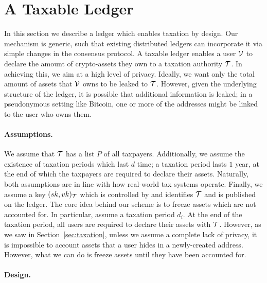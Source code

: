 \section{A Taxable Ledger}\label{sec:taxchain}

In this section we describe a ledger which enables taxation by design. Our
mechanism is generic, such that existing distributed ledgers can incorporate it
via simple changes in the consensus protocol. A taxable ledger enables a user
$\mathcal{V}$ to declare the amount of crypto-assets they own to a taxation authority
$\mathcal{T}$. In achieving this, we aim at a high level of privacy. Ideally, we
want only the total amount of assets that $\mathcal{V}$ owns to be leaked to
$\mathcal{T}$. However, given the underlying structure of the ledger, it is
possible that additional information is leaked; \eg in a pseudonymous setting
like Bitcoin, one or more of the addresses might be linked to the user who owns
them.

\paragraph{Assumptions.}

We assume that $\mathcal{T}$ has a list $P$ of all taxpayers.
Additionally, we assume the existence of taxation periods which last $d$ time;
\eg a taxation period lasts $1$ year, at the end of which the taxpayers are
required to declare their assets. Naturally, both assumptions are in line with
how real-world tax systems operate. Finally, we assume a key
$(sk, vk)_\mathcal{T}$ which is controlled by and identifies $\mathcal{T}$ and is
published on the ledger.
The core idea behind our scheme is to freeze assets which are not accounted
for. In particular, assume a taxation period $d_i$. At the end of the taxation
period, all users are required to declare their assets with $\mathcal{T}$.
However, as we saw in Section~\ref{sec:taxation}, unless we assume a complete
lack of privacy, it is impossible to account assets that a user hides in a
newly-created address. However, what we can do is freeze assets until they have
been accounted for.

\paragraph{Design.}

